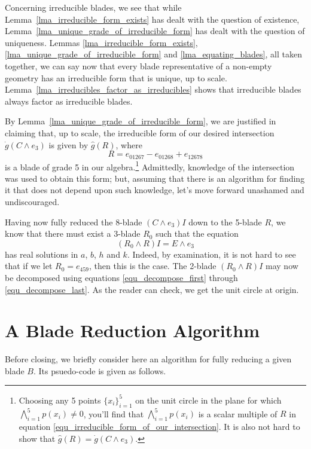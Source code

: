 \documentclass{birkjour}
\theoremstyle{definition}
\theoremstyle{remark}
\numberwithin{equation}{section}
\newcommand{\gd}{\dot{g}}
\newcommand{\gh}{\hat{g}}
\begin{document}
Concerning irreducible blades, we see that while Lemma~\ref{lma_irreducible_form_exists} has dealt with
the question of existence, Lemma~\ref{lma_unique_grade_of_irreducible_form} has dealt with the question of uniqueness.  Lemmas \ref{lma_irreducible_form_exists}, \ref{lma_unique_grade_of_irreducible_form}
and \ref{lma_equating_blades}, all taken together, we can
say now that every blade representative of a non-empty geometry has an irreducible form that
is unique, up to scale.
Lemma~\ref{lma_irreducibles_factor_as_irreducibles} shows that irreducible blades always factor
as irreducible blades.

By Lemma~\ref{lma_unique_grade_of_irreducible_form}, we are justified in
claiming that, up to scale, the irreducible form of
our desired intersection $\gd(C\wedge e_3)$ is given by $\gh(R)$, where
\begin{equation}\label{equ_irreducible_form_of_our_intersection}
R = e_{01267} - e_{01268} + e_{12678}
\end{equation}
is a blade of grade 5 in our algebra.\footnote{Choosing any 5 points $\{x_i\}_{i=1}^5$ on
the unit circle in the plane for which $\bigwedge_{i=1}^5 p(x_i)\neq 0$, you'll find that $\bigwedge_{i=1}^5 p(x_i)$
is a scalar multiple of $R$ in equation \eqref{equ_irreducible_form_of_our_intersection}.  It is also not
hard to show that $\gh(R)=\gd(C\wedge e_3)$.}
Admittedly, knowledge of the intersection was used
to obtain this form; but, assuming that there is an algorithm for finding it
that does not depend upon such knowledge, let's move forward unashamed
and undiscouraged.

Having now fully reduced the 8-blade $(C\wedge e_3)I$ down to the 5-blade $R$, we know
that there must exist a 3-blade $R_0$ such that the equation
\begin{equation*}
(R_0\wedge R)I = E\wedge e_3
\end{equation*}
has real solutions in $a$, $b$, $h$ and $k$.
Indeed, by examination, it is not hard to see that if we let $R_0=e_{459}$, then this is the case.
The 2-blade $(R_0\wedge R)I$ may now be decomposed using equations \eqref{equ_decompose_first} through \eqref{equ_decompose_last}.
As the reader can check, we get the unit circle at origin.

\section{A Blade Reduction Algorithm}

Before closing, we briefly consider here an algorithm for fully reducing a given blade $B$.
Its psuedo-code is given as follows.
\end{document}
